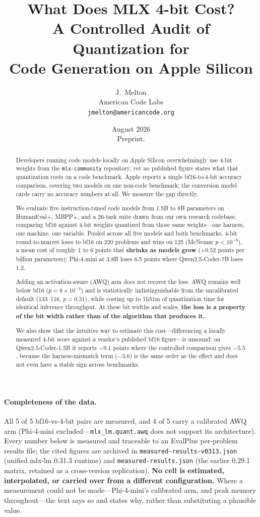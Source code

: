 \documentclass[11pt]{article}
\title{What Does MLX 4-bit Cost?\\
A Controlled Audit of Quantization for\\
Code Generation on Apple Silicon}
\author{J.~Melton \\
  American Code Labs \\
  \texttt{jmelton@americancode.org}}
\date{August 2026 \\ \smallskip \small Preprint.}
\begin{document}
\maketitle

\begin{abstract}
Developers running code models locally on Apple Silicon overwhelmingly use 4-bit
weights from the \texttt{mlx-community} repository, yet no published figure states what
that quantization costs on a code benchmark. Apple reports a single bf16-to-4-bit
accuracy comparison, covering two models on one non-code benchmark; the conversion
model cards carry no accuracy numbers at all. We measure the gap directly.

We evaluate five instruction-tuned code models from 1.5B to 8B parameters on
HumanEval+, MBPP+, and a 26-task suite drawn from our own research codebase, comparing
bf16 against 4-bit weights quantized from those same weights---one harness, one
machine, one variable. Pooled across all five models and both benchmarks, 4-bit
round-to-nearest loses to bf16 on 220 problems and wins on 125 (McNemar
$p < 10^{-6}$), a mean cost of roughly 1 to 6 points that \textbf{shrinks as models
grow} ($+0.52$ points per billion parameters): Phi-4-mini at 3.8B loses 6.5 points
where Qwen2.5-Coder-7B loses 1.2.

Adding an activation-aware (AWQ) arm does not recover the loss. AWQ remains well below
bf16 ($p = 8 \times 10^{-4}$) and is statistically indistinguishable from the
uncalibrated default (133--116, $p = 0.31$), while costing up to 1h51m of quantization
time for identical inference throughput. At these bit widths and scales, \textbf{the
loss is a property of the bit width rather than of the algorithm that produces it.}

We also show that the intuitive way to estimate this cost---differencing a locally
measured 4-bit score against a vendor's published bf16 figure---is unsound: on
Qwen2.5-Coder-1.5B it reports $-9.1$ points where the controlled comparison gives
$-5.5$, because the harness-mismatch term ($-3.6$) is the same order as the effect and
does not even have a stable sign across benchmarks.
\end{abstract}

\paragraph{Completeness of the data.} All 5 of 5 bf16-vs-4-bit pairs are measured, and
4 of 5 carry a calibrated AWQ arm (Phi-4-mini excluded---\texttt{mlx\_lm.quant.awq}
does not support its architecture). Every number below is measured and traceable to an
EvalPlus per-problem results file; the cited figures are archived in
\texttt{measured-results-v0313.json} (unified mlx-lm 0.31.3 runtime) and
\texttt{measured-results.json} (the earlier 0.29.1 matrix, retained as a cross-version
replication). \textbf{No cell is estimated, interpolated, or carried over from a
different configuration.} Where a measurement could not be made---Phi-4-mini's
calibrated arm, and peak memory throughout---the text says so and states why, rather
than substituting a plausible value.
\end{document}
